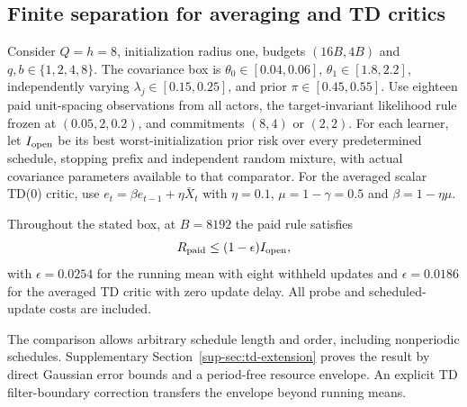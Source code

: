 \subsection{Finite separation for averaging and TD critics}
Consider $Q=h=8$, initialization radius one, budgets $(16B,4B)$ and $q,b\in\{1,2,4,8\}$.
The covariance box is $\theta_0\in[0.04,0.06]$, $\theta_1\in[1.8,2.2]$, independently varying $\lambda_j\in[0.15,0.25]$, and prior $\pi\in[0.45,0.55]$.
Use eighteen paid unit-spacing observations from all actors, the target-invariant likelihood rule frozen at $(0.05,2,0.2)$, and commitments $(8,4)$ or $(2,2)$.
For each learner, let $I_{\rm open}$ be its best worst-initialization prior risk over every predetermined schedule, stopping prefix and independent random mixture, with actual covariance parameters available to that comparator.
For the averaged scalar TD(0) critic, use $e_t=\beta e_{t-1}+\eta\bar X_t$ with $\eta=0.1$, $\mu=1-\gamma=0.5$ and $\beta=1-\eta\mu$.

\begin{theorem}
Throughout the stated box, at $B=8192$ the paid rule satisfies
\[
R_{\rm paid}\le(1-\epsilon)I_{\rm open},
\]
with $\epsilon=0.0254$ for the running mean with eight withheld updates and $\epsilon=0.0186$ for the averaged TD critic with zero update delay.
All probe and scheduled-update costs are included.
\label{thm:finite-robust-separation}
\end{theorem}

The comparison allows arbitrary schedule length and order, including nonperiodic schedules.
Supplementary Section~\ref{sup-sec:td-extension} proves the result by direct Gaussian error bounds and a period-free resource envelope.
An explicit TD filter-boundary correction transfers the envelope beyond running means.
